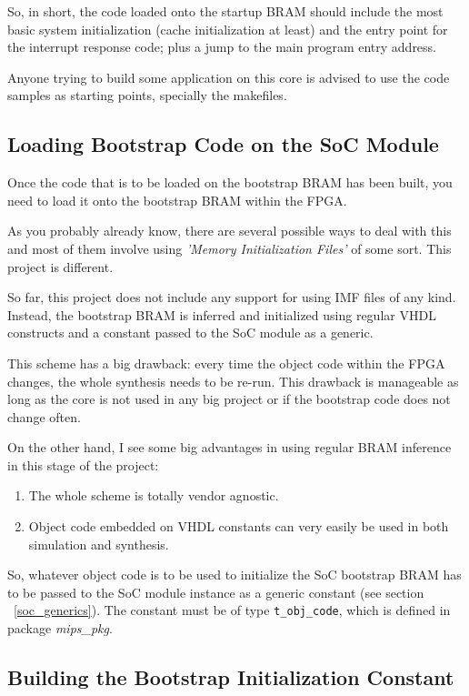 So, in short, the code loaded onto the startup BRAM should include the most 
basic system initialization (cache initialization at least) and the entry point
for the interrupt response code; plus a jump to the main program entry address.

Anyone trying to build some application on this core is advised to use the code 
samples as starting points, specially the makefiles.


\subsection{Loading Bootstrap Code on the SoC Module}
\label{loading_bootstrap_code}

Once the code that is to be loaded on the bootstrap BRAM has been built, you 
need to load it onto the bootstrap BRAM within the FPGA.

As you probably already know, there are several possible ways to deal with this 
and most of them involve using \emph{'Memory Initialization Files'} of
some sort. This project is different.

So far, this project does not include any support for using IMF 
files of any kind. Instead, the bootstrap BRAM is inferred and initialized 
using regular VHDL constructs and a constant passed to the SoC module as a 
generic.

This scheme has a big drawback: every time the object code within the FPGA 
changes, the whole synthesis needs to be re-run. This drawback is manageable
as long as the core is not used in any big project or if the bootstrap code 
does not change often.

On the other hand, I see some big advantages in using regular BRAM inference in
this stage of the project:

\begin{enumerate}
\item The whole scheme is totally vendor agnostic.
\item Object code embedded on VHDL constants can very easily be used in both simulation and synthesis.
\end{enumerate}

So, whatever object code is to be used to initialize the SoC bootstrap BRAM has
to be passed to the SoC module instance as a generic constant (see section 
~\ref{soc_generics}). The constant must be of type \texttt{t\_obj\_code}, which 
is defined in package \emph{mips\_pkg}.


\subsection{Building the Bootstrap Initialization Constant}
\label{boot_code_conversion}

